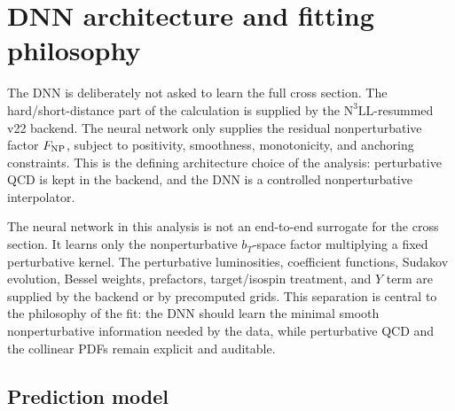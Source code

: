 \documentclass[11pt]{article}
\newcommand{\bt}{b_T}
\newcommand{\FNP}{F_{\rm NP}}
\newcommand{\NthreeLL}{\mathrm{N^{3}LL}}
\begin{document}
\section{DNN architecture and fitting philosophy}
\label{sec:dnn}


The DNN is deliberately not asked to learn the full cross section.  The hard/short-distance part of the calculation is supplied by the $\NthreeLL$-resummed v22 backend.  The neural network only supplies the residual nonperturbative factor $\FNP$, subject to positivity, smoothness, monotonicity, and anchoring constraints.  This is the defining architecture choice of the analysis: perturbative QCD is kept in the backend, and the DNN is a controlled nonperturbative interpolator.

The neural network in this analysis is not an end-to-end surrogate for the cross section.  It learns only the nonperturbative $\bt$-space factor multiplying a fixed perturbative kernel.  The perturbative luminosities, coefficient functions, Sudakov evolution, Bessel weights, prefactors, target/isospin treatment, and $Y$ term are supplied by the backend or by precomputed grids.  This separation is central to the philosophy of the fit: the DNN should learn the minimal smooth nonperturbative information needed by the data, while perturbative QCD and the collinear PDFs remain explicit and auditable.

\subsection{Prediction model}
\end{document}
